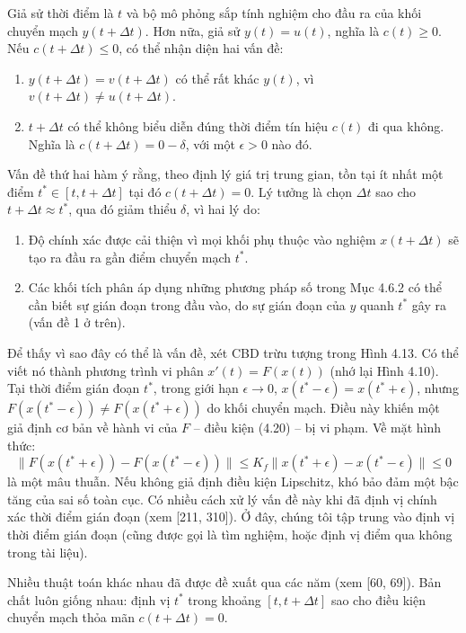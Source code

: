 Giả sử thời điểm là $t$ và bộ mô phỏng sắp tính nghiệm cho đầu ra của khối chuyển mạch $y(t+\Delta t)$. Hơn nữa, giả sử $y(t)=u(t)$, nghĩa là $c(t)\ge0$. Nếu $c(t+\Delta t)\le0$, có thể nhận diện hai vấn đề:
\begin{enumerate}
\item $y(t+\Delta t)=v(t+\Delta t)$ có thể rất khác $y(t)$, vì $v(t+\Delta t)\ne u(t+\Delta t)$.
\item $t+\Delta t$ có thể không biểu diễn đúng thời điểm tín hiệu $c(t)$ đi qua không. Nghĩa là $c(t+\Delta t)=0-\delta$, với một $\epsilon>0$ nào đó.
\end{enumerate}
Vấn đề thứ hai hàm ý rằng, theo định lý giá trị trung gian, tồn tại ít nhất một điểm $t^*\in[t,t+\Delta t]$ tại đó $c(t+\Delta t)=0$. Lý tưởng là chọn $\Delta t$ sao cho $t+\Delta t\approx t^*$, qua đó giảm thiểu $\delta$, vì hai lý do:
\begin{enumerate}
\item Độ chính xác được cải thiện vì mọi khối phụ thuộc vào nghiệm $x(t+\Delta t)$ sẽ tạo ra đầu ra gần điểm chuyển mạch $t^*$.
\item Các khối tích phân áp dụng những phương pháp số trong Mục 4.6.2 có thể cần biết sự gián đoạn trong đầu vào, do sự gián đoạn của $y$ quanh $t^*$ gây ra (vấn đề 1 ở trên).
\end{enumerate}
Để thấy vì sao đây có thể là vấn đề, xét CBD trừu tượng trong Hình 4.13. Có thể viết nó thành phương trình vi phân $x'(t)=F(x(t))$ (nhớ lại Hình 4.10). Tại thời điểm gián đoạn $t^*$, trong giới hạn $\epsilon\to0$, $x(t^*-\epsilon)=x(t^*+\epsilon)$, nhưng $F(x(t^*-\epsilon))\ne F(x(t^*+\epsilon))$ do khối chuyển mạch. Điều này khiến một giả định cơ bản về hành vi của $F$ -- điều kiện (4.20) -- bị vi phạm. Về mặt hình thức:
\[\lVert F(x(t^*+\epsilon))-F(x(t^*-\epsilon))\rVert\le K_f\lVert x(t^*+\epsilon)-x(t^*-\epsilon)\rVert\le0\]
là một mâu thuẫn.
Nếu không giả định điều kiện Lipschitz, khó bảo đảm một bậc tăng của sai số toàn cục. Có nhiều cách xử lý vấn đề này khi đã định vị chính xác thời điểm gián đoạn (xem [211, 310]). Ở đây, chúng tôi tập trung vào định vị thời điểm gián đoạn (cũng được gọi là tìm nghiệm, hoặc định vị điểm qua không trong tài liệu).

Nhiều thuật toán khác nhau đã được đề xuất qua các năm (xem [60, 69]). Bản chất luôn giống nhau: định vị $t^*$ trong khoảng $[t,t+\Delta t]$ sao cho điều kiện chuyển mạch thỏa mãn $c(t+\Delta t)=0$.


